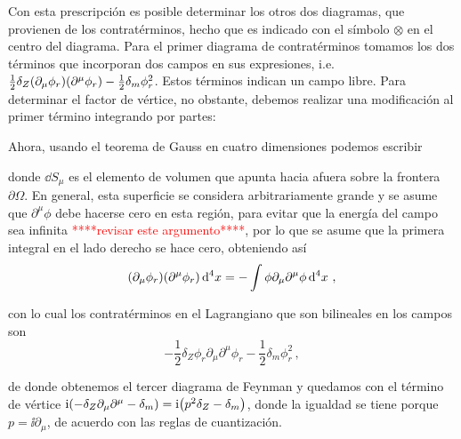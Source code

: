 Con esta prescripción es posible determinar los otros dos diagramas, que provienen de los contratérminos, hecho que es indicado con el símbolo $\otimes$ en el centro del diagrama. Para el primer diagrama de contratérminos tomamos los dos términos que incorporan dos campos en sus expresiones, i.e. $\frac{1}{2} \delta_Z \qty(\partial_\mu\phi_r)\qty(\partial^\mu\phi_r) - \frac{1}{2} \delta_m \phi_r^2$. Estos términos indican un campo libre. Para determinar el factor de vértice, no obstante, debemos realizar una modificación al primer término integrando por partes:
%

Ahora, usando el teorema de Gauss en cuatro dimensiones podemos escribir
%

\noindent donde $\dd{S_\mu}$ es el elemento de volumen que apunta hacia afuera sobre la frontera $\partial \Omega$. En general, esta superficie se considera arbitrariamente grande y se asume que $\partial^\mu \phi$ debe hacerse cero en esta región, para evitar que la energía del campo sea infinita \textcolor{red}{****revisar este argumento****}, por lo que se asume que la primera integral en el lado derecho se hace cero, obteniendo así
%
\begin{equation}
	\qty(\partial_\mu\phi_r)\qty(\partial^\mu\phi_r) \dd[4]{x} = - \int \phi \partial_\mu \partial^\mu \phi \dd[4]{x} \,,
\end{equation}

\noindent con lo cual los contratérminos en el Lagrangiano que son bilineales en los campos son
%
\begin{equation}
	-\frac{1}{2} \delta_Z \phi_r \partial_\mu \partial^\mu \phi_r - \frac{1}{2} \delta_m \phi_r^2 \,,
\end{equation}

de donde obtenemos el tercer diagrama de Feynman y quedamos con el término de vértice $\mathrm{i} \qty(-\delta_Z\partial_\mu \partial^\mu - \delta_m) = \mathrm{i} \qty(p^2 \delta_Z - \delta_m)$, donde la igualdad se tiene porque $p = \ii\partial_\mu$, de acuerdo con las reglas de cuantización.


